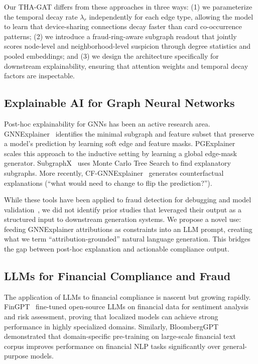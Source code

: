\documentclass[journal]{IEEEtran}
\begin{document}
Our THA-GAT differs from these approaches in three ways: (1) we parameterize the temporal decay rate $\lambda_r$ independently for each edge type, allowing the model to learn that device-sharing connections decay faster than card co-occurrence patterns; (2) we introduce a fraud-ring-aware subgraph readout that jointly scores node-level and neighborhood-level suspicion through degree statistics and pooled embeddings; and (3) we design the architecture specifically for downstream explainability, ensuring that attention weights and temporal decay factors are inspectable.

\subsection{Explainable AI for Graph Neural Networks}

Post-hoc explainability for GNNs has been an active research area. GNNExplainer~\cite{ying2019gnnexplainer} identifies the minimal subgraph and feature subset that preserve a model's prediction by learning soft edge and feature masks. PGExplainer~\cite{luo2020pgexplainer} scales this approach to the inductive setting by learning a global edge-mask generator. SubgraphX~\cite{yuan2021subgraphx} uses Monte Carlo Tree Search to find explanatory subgraphs. More recently, CF-GNNExplainer~\cite{lucic2022cfgnn} generates counterfactual explanations (``what would need to change to flip the prediction?'').

While these tools have been applied to fraud detection for debugging and model validation~\cite{tang2024explainable}, we did not identify prior studies that leveraged their output as a structured input to downstream generation systems. We propose a novel use: feeding GNNExplainer attributions as constraints into an LLM prompt, creating what we term ``attribution-grounded'' natural language generation. This bridges the gap between post-hoc explanation and actionable compliance output.

\subsection{LLMs for Financial Compliance and Fraud}

The application of LLMs to financial compliance is nascent but growing rapidly. FinGPT~\cite{yang2023fingpt} fine-tuned open-source LLMs on financial data for sentiment analysis and risk assessment, proving that localized models can achieve strong performance in highly specialized domains. Similarly, BloombergGPT~\cite{wu2023bloomberggpt} demonstrated that domain-specific pre-training on large-scale financial text corpus improves performance on financial NLP tasks significantly over general-purpose models. 
\end{document}

